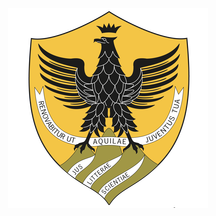 
\begin{figure}[h]
    \begin{minipage}[t]{0.2\textwidth}
        \includegraphics[width=\textwidth]{./img/univaq_logo.png}
    \end{minipage}
    \hfill
    \begin{minipage}[t]{0.15\textwidth}

\end{minipage}
\end{figure}

